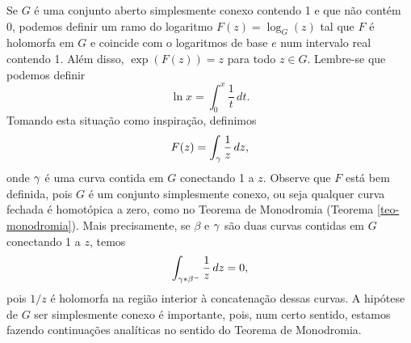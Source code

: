    Se $G$ é uma conjunto aberto simplesmente conexo contendo 1 e que não contém 0,
    podemos definir um ramo do logaritmo $F(z) = \log_G(z)$ tal que $F$ é holomorfa 
    em $G$ e coincide com o logaritmos de base $e$ num intervalo real contendo 1. 
    Além disso, $\exp(F(z)) = z$ para todo $z \in G$. Lembre-se que podemos definir
    \begin{equation*}
        \ln{x} = \int_{0}^{x}\frac{1}{t} \, dt.
    \end{equation*}    
    Tomando esta situação como inspiração, definimos
    \begin{equation*}
        F(z) = \int_\gamma \frac{1}{z} \, dz,
    \end{equation*}
    onde $\gamma$ é uma curva contida em $G$ conectando 1 a $z$. Observe que $F$ está 
    bem definida, pois $G$ é um conjunto simplesmente conexo, ou seja qualquer 
    curva fechada é homotópica a zero, como no Teorema de Monodromia 
    (Teorema \ref{teo-monodromia}). Mais precisamente, se $\beta$ e $\gamma$ são 
    duas curvas contidas em $G$ conectando 1 a $z$, temos
    \begin{equation*}
        \int_{\gamma * \beta^-} \frac{1}{z} \, dz = 0,
    \end{equation*}    
    pois $1/z$ é holomorfa na região interior à concatenação dessas curvas. 
    A hipótese de $G$ ser simplesmente conexo é importante, pois, 
    num certo sentido, estamos fazendo continuações analíticas 
    no sentido do Teorema de Monodromia.
    
